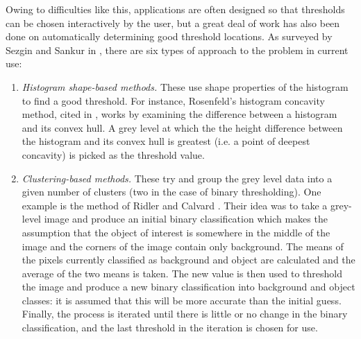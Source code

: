Owing to difficulties like this, applications are often designed so that thresholds can be chosen interactively by the user, but a great deal of work has also been done on automatically determining good threshold locations. As surveyed by Sezgin and Sankur in \cite{sezgin04}, there are six types of approach to the problem in current use:

\begin{enumerate}

\item \emph{Histogram shape-based methods.} These use shape properties of the histogram to find a good threshold. For instance, Rosenfeld's histogram concavity method, cited in \cite{lee.c92}, works by examining the difference between a histogram and its convex hull. A grey level at which the the height difference between the histogram and its convex hull is greatest (i.e. a point of deepest concavity) is picked as the threshold value.

\item \emph{Clustering-based methods.} These try and group the grey level data into a given number of clusters (two in the case of binary thresholding). One example is the method of Ridler and Calvard \cite{ridler78}. Their idea was to take a grey-level image and produce an initial binary classification which makes the assumption that the object of interest is somewhere in the middle of the image and the corners of the image contain only background. The means of the pixels currently classified as background and object are calculated and the average of the two means is taken. The new value is then used to threshold the image and produce a new binary classification into background and object classes: it is assumed that this will be more accurate than the initial guess. Finally, the process is iterated until there is little or no change in the binary classification, and the last threshold in the iteration is chosen for use.

\enlargethispage*{\baselineskip}


\end{enumerate}
